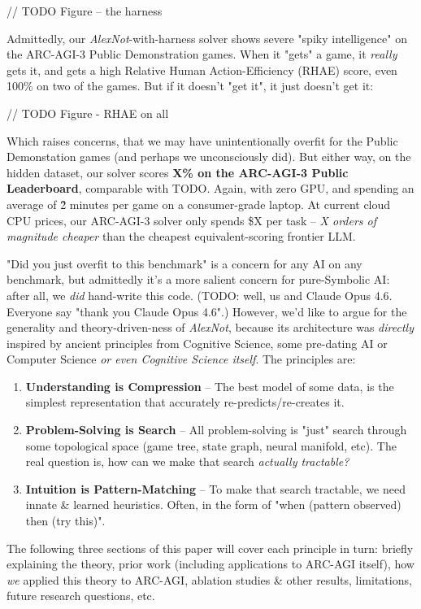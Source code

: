\documentclass{article}
\begin{document}
// TODO Figure -- the harness

Admittedly, our \textit{AlexNot}-with-harness solver shows severe "spiky intelligence" on the ARC-AGI-3 Public Demonstration games. When it "gets" a game, it \textit{really} gets it, and gets a high Relative Human Action-Efficiency (RHAE) score, even 100\% on two of the games. But if it doesn't "get it", it just doesn't get it:

// TODO Figure - RHAE on all

Which raises concerns, that we may have unintentionally overfit for the Public Demonstation games (and perhaps we unconsciously did). But either way, on the hidden dataset, our solver scores \textbf{X\% on the ARC-AGI-3 Public Leaderboard}, comparable with TODO. Again, with zero GPU, and spending an average of \~2 minutes per game on a consumer-grade laptop. At current cloud CPU prices, our ARC-AGI-3 solver only spends \$X per task -- \textit{X orders of magnitude cheaper} than the cheapest equivalent-scoring frontier LLM.

"Did you just overfit to this benchmark" is a concern for any AI on any benchmark, but admittedly it's a more salient concern for pure-Symbolic AI: after all, we \textit{did} hand-write this code. (TODO: well, us and Claude Opus 4.6. Everyone say "thank you Claude Opus 4.6".) However, we'd like to argue for the generality and theory-driven-ness of \textit{AlexNot}, because its architecture was \textit{directly} inspired by ancient principles from Cognitive Science, some pre-dating AI or Computer Science \textit{or even Cognitive Science itself}. The principles are:

\begin{enumerate}
    \item \textbf{Understanding is Compression} -- The best model of some data, is the simplest representation that accurately re-predicts/re-creates it.
    \item \textbf{Problem-Solving is Search} -- All problem-solving is "just" search through some topological space (game tree, state graph, neural manifold, etc). The real question is, how can we make that search \textit{actually tractable?}
    \item \textbf{Intuition is Pattern-Matching} -- To make that search tractable, we need innate \& learned heuristics. Often, in the form of "when (pattern observed) then (try this)".
\end{enumerate}

The following three sections of this paper will cover each principle in turn: briefly explaining the theory, prior work (including applications to ARC-AGI itself), how \textit{we} applied this theory to ARC-AGI, ablation studies \& other results, limitations, future research questions, etc.
\end{document}
